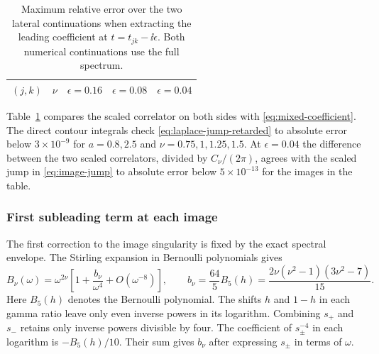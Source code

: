 \begin{table}[t]
 \centering\small
 \begin{tabular}{ccccc}
 \hline
 \((j,k)\) & \(\nu\) & \(\epsilon=0.16\) & \(\epsilon=0.08\) &
 \(\epsilon=0.04\) \\
 \hline
 
 \end{tabular}
 \caption{Maximum relative error over the two lateral continuations
 when extracting the leading coefficient at \(t=t_{jk}-\ii\epsilon\).
 Both numerical continuations use the full spectrum.}
 \label{tab:mixed-check}
\end{table}

Table~\ref{tab:mixed-check} compares the scaled correlator on both
sides with \eqref{eq:mixed-coefficient}. The direct contour integrals
check \eqref{eq:laplace-jump-retarded} to absolute error below
\(3\times10^{-9}\) for \(a=0.8,2.5\) and
\(\nu=0.75,1,1.25,1.5\). At \(\epsilon=0.04\) the difference
between the two scaled correlators, divided by \(C_\nu/(2\pi)\),
agrees with the scaled jump in \eqref{eq:image-jump} to absolute
error below \(5\times10^{-13}\) for the images in the table.

\subsubsection{First subleading term at each image}

The first correction to the image singularity is fixed
by the exact spectral envelope. The Stirling expansion
in Bernoulli polynomials \cite{NIST:DLMF} gives
\begin{equation}
 B_\nu(\omega)=\omega^{2\nu}
   \left[1+\frac{b_\nu}{\omega^4}+O(\omega^{-8})\right],
 \qquad b_\nu=\frac{64}{5}B_5(h)
   =\frac{2\nu(\nu^2-1)(3\nu^2-7)}{15}.
 \label{eq:lovelock-envelope-subleading}
\end{equation}
Here \(B_5(h)\) denotes the Bernoulli polynomial. The shifts
\(h\) and \(1-h\) in each gamma ratio leave only even inverse
powers in its logarithm. Combining \(s_+\) and \(s_-\)
retains only inverse powers divisible by four. The coefficient
of \(s_\pm^{-4}\) in each logarithm is \(-B_5(h)/10\).
Their sum gives \(b_\nu\) after expressing \(s_\pm\) in
terms of \(\omega\).

